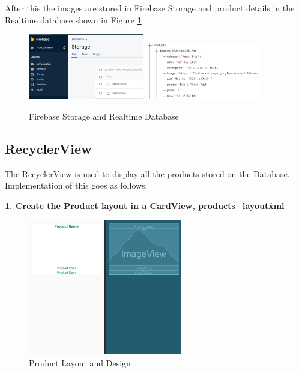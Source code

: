 After this the images are stored in Firebase Storage and product details in the Realtime database shown in Figure \ref{firebasestordb}
\begin{figure}[h!]
	\caption{Firebase Storage and Realtime Database}
	\label{firebasestordb}
	\centering
	\includegraphics[width=0.45\textwidth]{Images/admin_products_storage_img.png}
	\includegraphics[width=0.45\textwidth]{Images/admin_products_storage_db.png}
\end{figure}
\newpage

\subsection{RecyclerView}
The RecyclerView is used to display all the products stored on the Database.
Implementation of this goes as follows:\newline

\textbf{1. Create the Product layout in a CardView, products\_layout\.xml}
\begin{figure}[h!]
	\caption{Product Layout and Design}
	\label{productlayout}
	\centering
	\includegraphics[width=0.6\textwidth]{Images/product_layout.png}
\end{figure}

